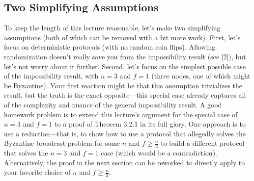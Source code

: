 \subsection{Two Simplifying Assumptions}
To keep the length of this lecture reasonable, let’s make two simplifying assumptions (both
of which can be removed with a bit more work). First, let’s focus on deterministic protocols (with no random coin flips). Allowing randomization doesn't really save you from the impossibility result (see [2]), but let’s not worry about it further. Second, let’s focus on the
simplest possible case of the impossibility result, with $n = 3$ and $f = 1$ (three nodes, one
of which might be Byzantine). Your first reaction might be that this assumption trivializes
the result, but the truth is the exact opposite—this special case already captures all of the
complexity and nuance of the general impossibility result. A good homework problem is
to extend this lecture’s argument for the special case of $n = 3$ and $f = 1$ to a proof of
Theorem 3.2.1 in its full glory. One approach is to use a reduction—that is, to show how
to use a protocol that allegedly solves the Byzantine broadcast problem for some $n$ and
$f \geq \frac{n}{3}$ to build a different protocol that solves the $n = 3$ and $f = 1$ case (which would
be a contradiction). Alternatively, the proof in the next section can be reworked to directly
apply to your favorite choice of $n$ and $f \geq \frac{n}{3}$.

